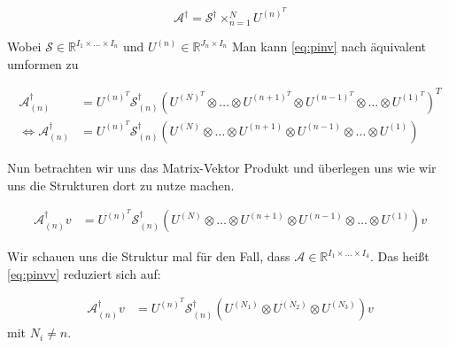 \begin{equation} \label{eq:pinv}
\mathcal{A}^{\dagger} = \mathcal{S}^{\dagger} \times_{n=1}^{N} U^{ (n) ^{T} }
\end{equation}

Wobei $\mathcal{S} \in \mathbb{R}^{I_{1} \times \dots \times I_{n}}$ und $U^{(n)} \in \mathbb{R}^{J_{n} \times I_{n}}$
Man kann \ref{eq:pinv} nach \cite[462]{Kolda} äquivalent umformen zu

\begin{equation}
\begin{aligned}
\mathcal{A}^{\dagger}_{(n)}  &= U^{ (n) ^{T} }  \mathcal{S}^{\dagger}_{(n)} ( U^{ (N) ^{T} } \otimes \dots \otimes U^{ (n+1) ^{T} } \otimes U^{ (n-1) ^{T} } \otimes \dots \otimes U^{ (1) ^{T} })^{T} \\ \iff
\mathcal{A}^{\dagger}_{(n)} &= U^{ (n) ^{T} }  \mathcal{S}^{\dagger}_{(n)} ( U^{ (N)  } \otimes \dots \otimes U^{ (n+1) } \otimes U^{ (n-1) } \otimes \dots \otimes U^{ (1) })
\end{aligned}
\end{equation}

Nun betrachten wir uns das Matrix-Vektor Produkt und überlegen uns wie wir uns die Strukturen dort zu nutze machen.

\begin{equation} \label{eq:pinvv}
\begin{aligned}
\mathcal{A}^{\dagger}_{(n)}v&= U^{ (n) ^{T} }  \mathcal{S}^{\dagger}_{(n)} ( U^{ (N)  } \otimes \dots \otimes U^{ (n+1) } \otimes U^{ (n-1) } \otimes \dots \otimes U^{ (1) }) v
\end{aligned}
\end{equation}

Wir schauen uns die Struktur mal für den Fall, dass $\mathcal{A} \in \mathbb{R}^{I_{1} \times \dots \times I_{4}}$. Das heißt \ref{eq:pinvv} reduziert sich auf:

\begin{equation} \label{eq:pinvcase}
\begin{aligned}
\mathcal{A}^{\dagger}_{(n)}v&= U^{ (n) ^{T} }  \mathcal{S}^{\dagger}_{(n)} ( U^{ (N_{1})  } \otimes U^{ (N_{2})}  \otimes U^{ (N_{3}) }) v
\end{aligned}
\end{equation}
mit $N_{i} \neq n$.

